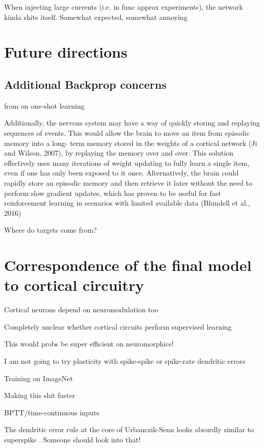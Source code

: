 When injecting large currents (i.e. in func approx experiments), the network kinda shits itself. Somewhat
expected, somewhat annoying




\section{Future directions}

\subsection{Additional Backprop concerns}


from \citep{Marblestone2016} on one-shot learning

Additionally, the nervous system may have a way of quickly
storing and replaying sequences of events. This would allow
the brain to move an item from episodic memory into a long-
term memory stored in the weights of a cortical network (Ji and
Wilson, 2007), by replaying the memory over and over. This
solution effectively uses many iterations of weight updating to
fully learn a single item, even if one has only been exposed to
it once. Alternatively, the brain could rapidly store an episodic
memory and then retrieve it later without the need to perform
slow gradient updates, which has proven to be useful for
fast reinforcement learning in scenarios with limited available
data (Blundell et al., 2016)


Where do targets come from? \cite{Bengio2015}


\section{Correspondence of the final model to cortical circuitry}

Cortical neurons depend on neuromodulation too \cite{Roelfsema2018}

Completely unclear whether cortical circuits perform supervised learning \citep{magee2020synaptic}


This would probs be super efficient on neuromorphics!

I am not going to try plasticity with spike-spike or spike-rate dendritic errors

Training on ImageNet

Making this shit faster

BPTT/time-continuous inputs


The dendritic error rule at the core of Urbanczik-Senn looks absurdly similar to superspike \citep{Zenke2018}.
Someone should look into that!

